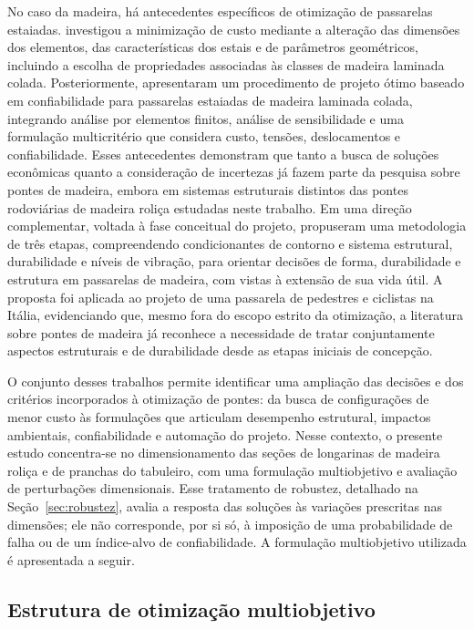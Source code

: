 No caso da madeira, há antecedentes específicos de otimização de passarelas estaiadas.
\textcite{Negrao1999} investigou a minimização de custo mediante a alteração das dimensões dos elementos, das características dos estais e de parâmetros geométricos, incluindo a escolha de propriedades associadas às classes de madeira laminada colada.
Posteriormente, \textcite{SimoesNegrao2005} apresentaram um procedimento de projeto ótimo baseado em confiabilidade para passarelas estaiadas de madeira laminada colada, integrando análise por elementos finitos, análise de sensibilidade e uma formulação multicritério que considera custo, tensões, deslocamentos e confiabilidade.
Esses antecedentes demonstram que tanto a busca de soluções econômicas quanto a consideração de incertezas já fazem parte da pesquisa sobre pontes de madeira, embora em sistemas estruturais distintos das pontes rodoviárias de madeira roliça estudadas neste trabalho.
Em uma direção complementar, voltada à fase conceitual do projeto, \textcite{Fiore2020} propuseram uma metodologia de três etapas, compreendendo condicionantes de contorno e sistema estrutural, durabilidade e níveis de vibração, para orientar decisões de forma, durabilidade e estrutura em passarelas de madeira, com vistas à extensão de sua vida útil. A proposta foi aplicada ao projeto de uma passarela de pedestres e ciclistas na Itália, evidenciando que, mesmo fora do escopo estrito da otimização, a literatura sobre pontes de madeira já reconhece a necessidade de tratar conjuntamente aspectos estruturais e de durabilidade desde as etapas iniciais de concepção.

O conjunto desses trabalhos permite identificar uma ampliação das decisões e dos critérios incorporados à otimização de pontes: da busca de configurações de menor custo às formulações que articulam desempenho estrutural, impactos ambientais, confiabilidade e automação do projeto.
Nesse contexto, o presente estudo concentra-se no dimensionamento das seções de longarinas de madeira roliça e de pranchas do tabuleiro, com uma formulação multiobjetivo e avaliação de perturbações dimensionais.
Esse tratamento de robustez, detalhado na Seção~\ref{sec:robustez}, avalia a resposta das soluções às variações prescritas nas dimensões; ele não corresponde, por si só, à imposição de uma probabilidade de falha ou de um índice-alvo de confiabilidade.
A formulação multiobjetivo utilizada é apresentada a seguir.

\subsection{Estrutura de otimização multiobjetivo}\label{sec:otim_multiobjetivo}

